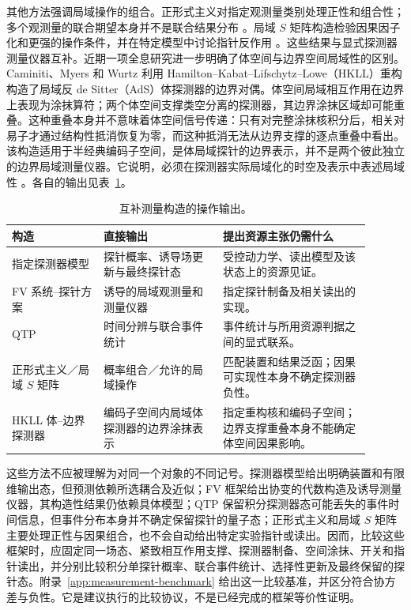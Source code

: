 \documentclass[UTF8,11pt,a4paper,fontset=none]{ctexart}
\begin{document}
其他方法强调局域操作的组合。正形式主义对指定观测量类别处理正性和组合性；多个观测量的联合期望本身并不是联合结果分布 \cite{Oeckl2026,OecklZampeli2026}。局域 $S$ 矩阵构造检验因果因子化和更强的操作条件，并在特定模型中讨论指针反作用 \cite{Simmons2026}。这些结果与显式探测器测量仪器互补。近期一项全息研究进一步明确了体空间与边界空间局域性的区别。Caminiti、Myers 和 Wurtz 利用 Hamilton--Kabat--Lifschytz--Lowe（HKLL）重构构造了局域反 de Sitter（AdS）体探测器的边界对偶。体空间局域相互作用在边界上表现为涂抹算符；两个体空间支撑类空分离的探测器，其边界涂抹区域却可能重叠。这种重叠本身并不意味着体空间信号传递：只有对完整涂抹核积分后，相关对易子才通过结构性抵消恢复为零，而这种抵消无法从边界支撑的逐点重叠中看出。该构造适用于半经典编码子空间，是体局域探针的边界表示，并不是两个彼此独立的边界局域测量仪器。它说明，必须在探测器实际局域化的时空及表示中表述局域性 \cite{CaminitiMyersWurtz2026}。各自的输出见表~\ref{tab:causal-measurements}。

\begin{table}[htbp]
\centering\small
\caption{互补测量构造的操作输出。}
\label{tab:causal-measurements}
\begin{tabular}{p{0.23\linewidth}p{0.30\linewidth}p{0.37\linewidth}}
\toprule
构造 & 直接输出 & 提出资源主张仍需什么\\
\midrule
指定探测器模型 \cite{PoloGomez2022} & 探针概率、诱导场更新与最终探针态 & 受控动力学、读出模型及该状态上的资源见证。\\
FV 系统--探针方案 \cite{FewsterVerch2020} & 诱导的局域观测量和测量仪器 & 指定探针制备及相关读出的实现。\\
QTP \cite{AnastopoulosHuSavvidou2023} & 时间分辨与联合事件统计 & 事件统计与所用资源判据之间的显式联系。\\
正形式主义／局域 $S$ 矩阵 \cite{OecklZampeli2026,Simmons2026} & 概率组合／允许的局域操作 & 匹配装置和结果泛函；因果可实现性本身不确定探测器负性。\\
HKLL 体–边界探测器 \cite{CaminitiMyersWurtz2026} & 编码子空间内局域体探测器的边界涂抹表示 & 指定重构核和编码子空间；边界支撑重叠本身不能确定体空间因果影响。\\
\bottomrule
\end{tabular}
\end{table}

这些方法不应被理解为对同一个对象的不同记号。探测器模型给出明确装置和有限维输出态，但预测依赖所选耦合及近似；FV 框架给出协变的代数构造及诱导测量仪器，其构造性结果仍依赖具体模型；QTP 保留积分探测器态可能丢失的事件时间信息，但事件分布本身并不确定保留探针的量子态；正形式主义和局域 $S$ 矩阵主要处理正性与因果组合，也不会自动给出特定实验指针或读出。因而，比较这些框架时，应固定同一场态、紧致相互作用支撑、探测器制备、空间涂抹、开关和指针读出，并分别比较积分单探针概率、联合事件统计、选择性更新及最终保留的探针态。附录~\ref{app:measurement-benchmark} 给出这一比较基准，并区分符合协方差与负性。它是建议执行的比较协议，不是已经完成的框架等价性证明。
\end{document}
